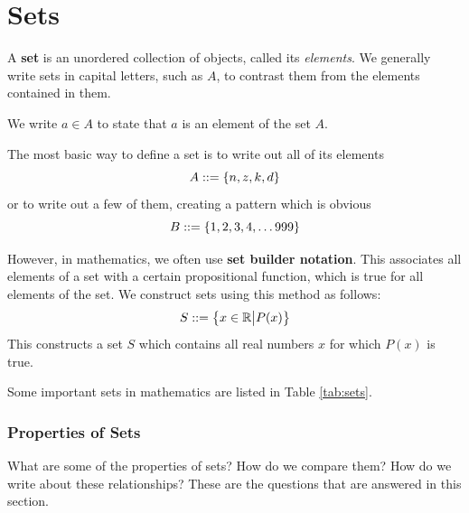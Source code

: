 \chapter{Sets}
\label{ch:sets}
A \textbf{set} is an unordered collection of objects, called its \emph{elements}. We generally write sets in capital letters, such as $A$, to contrast them from the elements contained in them.

We write $a \in A$ to state that $a$ is an element of the set $A$.

The most basic way to define a set is to write out all of its elements
\[ A : : = \left\{ n, z, k, d \right\} \]
or to write out a few of them, creating a pattern which is obvious
\[ B : : = \left\{ 1, 2, 3, 4, \ldots 999 \right\} \]

However, in mathematics, we often use \textbf{set builder notation}.
This associates all elements of a set with a certain propositional function, which is true for all elements of the set.
We construct sets using this method as follows:
\[ S : : = \left\{ x\in\mathbb R \big| P(x)\right\} \]
This constructs a set $S$ which contains all real numbers $x$ for which $P(x)$ is true.

Some important sets in mathematics are listed in Table \ref{tab:sets}.
\begin{table}
  \centering
  \caption{Important sets.}
  \label{tab:sets}
\end{table}

\subsection{Properties of Sets}

What are some of the properties of sets?
How do we compare them?
How do we write about these relationships?
These are the questions that are answered in this section.


